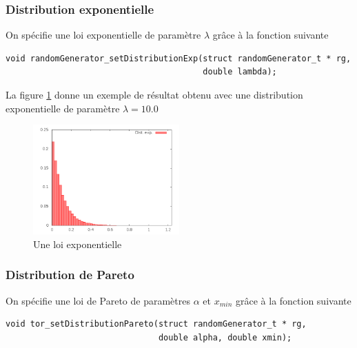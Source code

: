 %
\subsubsection{Distribution exponentielle}

   On spécifie une loi exponentielle de paramètre $\lambda$ grâce à la
fonction suivante 

\begin{verbatim}
void randomGenerator_setDistributionExp(struct randomGenerator_t * rg,
                                        double lambda);

\end{verbatim}

   La figure \ref{figure:distexp} donne un exemple de résultat obtenu
avec une distribution exponentielle de paramètre $\lambda = 10.0$

\begin{figure}[h]
\begin{center}
\includegraphics[width=0.5\textwidth]{DistributionExp.png}
\caption{Une loi exponentielle\label{figure:distexp}}
\end{center}
\end{figure}

%
\subsubsection{Distribution de Pareto}

   On spécifie une loi de Pareto de paramètres $\alpha$ et $x_{min}$ grâce à la
fonction suivante 

\begin{verbatim}
void tor_setDistributionPareto(struct randomGenerator_t * rg,
                               double alpha, double xmin);
\end{verbatim}

